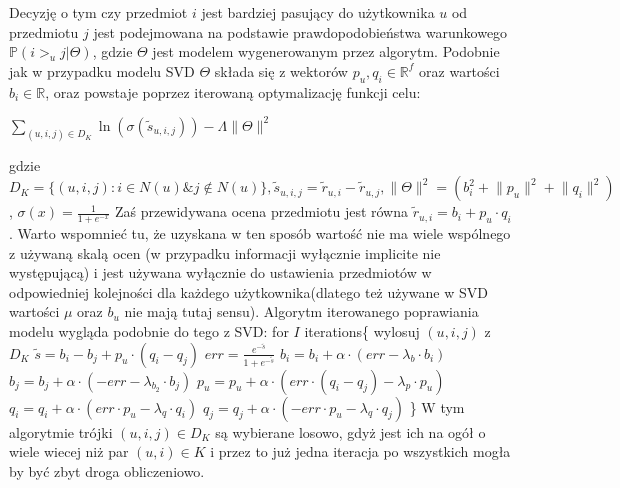 \documentclass{pracamgr}
\begin{document}
    Decyzję o tym czy przedmiot $i$ jest bardziej pasujący do użytkownika $u$ od przedmiotu $j$ jest podejmowana na podstawie prawdopodobieństwa warunkowego
    $\mathbb{P}(i>_u j|\Theta)$, gdzie $\Theta$ jest modelem wygenerowanym przez algorytm.
    Podobnie jak w przypadku modelu SVD $\Theta$ składa się z wektorów
    $p_u,q_i\in\mathbb{R}^f$ oraz wartości $b_i\in\mathbb{R}$, oraz powstaje poprzez iterowaną
    optymalizację funkcji celu:
    \begin{center}
     $\sum\limits_{(u,i,j)\in D_K}\ln{(\sigma(\tilde{s}_{u,i,j}))}-\Lambda\lVert\Theta\rVert^2$
    \end{center}
    gdzie $D_K=\{(u,i,j):i\in N(u) \& j\notin N(u)\}, \tilde{s}_{u,i,j}=\tilde{r}_{u,i}-\tilde{r}_{u,j}, \lVert\Theta\rVert^2=(b_i^2+\lVert p_u\rVert^2+\lVert q_i\rVert^2)$,
    $\sigma(x)=\frac{1}{1+e^{-x}}$\newline
    Zaś przewidywana ocena przedmiotu jest równa $\tilde{r}_{u,i}=b_i+p_u\cdot q_i$.\newline
    Warto wspomnieć tu, że uzyskana w ten sposób wartość nie ma wiele wspólnego z używaną skalą ocen 
    (w przypadku informacji wyłącznie implicite nie występującą) i jest używana wyłącznie do ustawienia przedmiotów w odpowiedniej kolejności
    dla każdego użytkownika(dlatego też używane w SVD wartości $\mu$ oraz $b_u$ nie mają tutaj sensu).\newline\newline
    Algorytm iterowanego poprawiania modelu wygląda podobnie do tego z SVD:\newline
    \hspace*{16pt}	for $I$ iterations\{\newline
    \hspace*{32pt}		wylosuj $(u,i,j)$ z $D_K$\newline 
    \hspace*{32pt}		$\tilde{s}=b_i-b_j+p_u\cdot(q_i-q_j)$\newline
    \hspace*{32pt}		$err=\frac{e^{-\tilde{s}}}{1+e^{-\tilde{s}}}$\newline
    \hspace*{32pt}		$b_i=b_i+\alpha\cdot(err-\lambda_b\cdot b_i)$\newline
    \hspace*{32pt}		$b_j=b_j+\alpha\cdot(-err-\lambda_{b_2}\cdot b_j)$\newline
    \hspace*{32pt}		$p_u=p_u+\alpha\cdot(err\cdot (q_i-q_j)-\lambda_p\cdot p_u)$\newline
    \hspace*{32pt}		$q_i=q_i+\alpha\cdot(err\cdot p_u-\lambda_q\cdot q_i)$\newline
    \hspace*{32pt}		$q_j=q_j+\alpha\cdot(-err\cdot p_u-\lambda_q\cdot q_j)$\newline
    \hspace*{16pt}	\}\newline
    W tym algorytmie trójki $(u,i,j)\in D_K$ są wybierane losowo, gdyż jest ich na ogół o wiele wiecej niż par $(u,i)\in K$
    i przez to już jedna iteracja po wszystkich mogła by być zbyt droga obliczeniowo.
\end{document}
